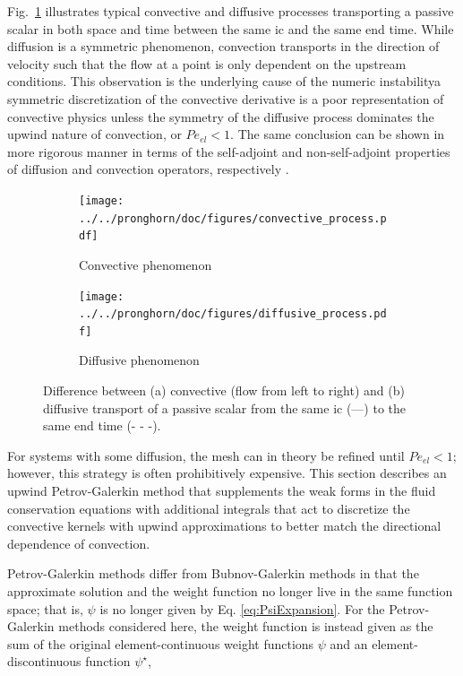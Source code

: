 Fig.\ \ref{fig:Convection_vs_Diffusion} illustrates typical convective and diffusive processes transporting a passive scalar in both space and time between the same \gls{ic} and the same end time. While diffusion is a symmetric phenomenon, convection transports in the direction of velocity such that the flow at a point is only dependent on the upstream conditions. This observation is the underlying cause of the numeric instability\mdash a symmetric discretization of the convective derivative is a poor representation of convective physics unless the symmetry of the diffusive process dominates the upwind nature of convection, or \(Pe_{el}<1\). The same conclusion can be shown in more rigorous manner in terms of the self-adjoint and non-self-adjoint properties of diffusion and convection operators, respectively \cite{zienkiewicz}.

\begin{figure}[!h]
\centering
\begin{subfigure}{.45\textwidth}
  \centering
  \texttt{[image: ../../pronghorn/doc/figures/convective\_process.pdf]}
  \caption{Convective phenomenon}
\end{subfigure}
\begin{subfigure}{.45\textwidth}
  \centering
  \texttt{[image: ../../pronghorn/doc/figures/diffusive\_process.pdf]}
  \caption{Diffusive phenomenon}
\end{subfigure}
\caption{Difference between (a) convective (flow from left to right) and (b) diffusive transport of a passive scalar from the same \gls{ic} (---) to the same end time (- - -).}
\label{fig:Convection_vs_Diffusion}
\end{figure}

For systems with some diffusion, the mesh can in theory be refined until \(Pe_{el}<1\); however, this strategy is often prohibitively expensive. This section describes an upwind Petrov-Galerkin method that supplements the weak forms in the fluid conservation equations with additional integrals that act to discretize the convective kernels with upwind approximations to better match the directional dependence of convection.

Petrov-Galerkin methods differ from Bubnov-Galerkin methods in that the approximate solution and the weight function no longer live in the same function space; that is, \(\psi\) is no longer given by Eq. \eqref{eq:PsiExpansion}. For the Petrov-Galerkin methods considered here, the weight function is instead given as the sum of the original element-continuous weight functions \(\psi\) and an element-discontinuous function \(\psi^\star\),

